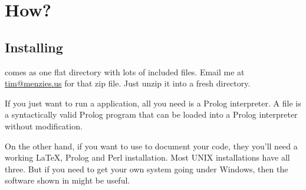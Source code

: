 
\section{How?}
\subsection{Installing} {\PROD} comes as one flat directory with
lots of included files. Email me at \url{tim@menzies.us} for that
zip file. Just unzip it into a fresh directory.

If you just want to run  a {\PROD} application, all you need is a
Prolog interpreter. A {\PROD} file is a syntactically valid Prolog
program that can be loaded into a Prolog interpreter without
modification.

On the other hand, if you want to use {\PROD} to document your code,
they you'll need a working {\LaTeX}, Prolog and Perl installation.
Most UNIX installations have all three. But if you need to get your
own system going under Windows, then the software shown in
 might be useful.

